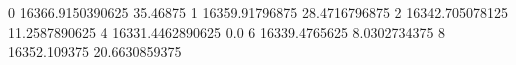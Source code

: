 0 16366.9150390625 35.46875
1 16359.91796875 28.4716796875
2 16342.705078125 11.2587890625
4 16331.4462890625 0.0
6 16339.4765625 8.0302734375
8 16352.109375 20.6630859375
